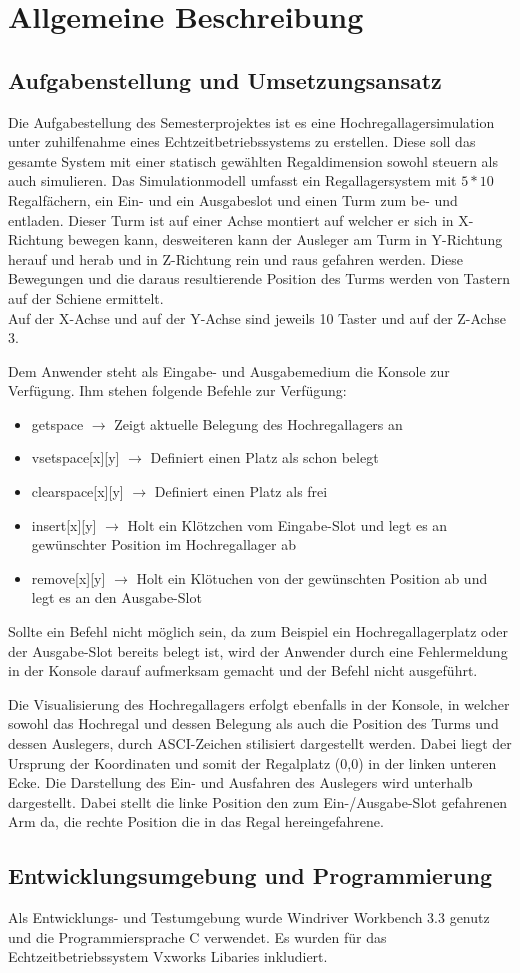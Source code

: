 \section{Allgemeine Beschreibung}
\subsection{Aufgabenstellung und Umsetzungsansatz}
Die Aufgabestellung des Semesterprojektes ist es eine Hochregallagersimulation unter zuhilfenahme eines Echtzeitbetriebssystems zu erstellen. Diese soll das gesamte System mit einer statisch gewählten Regaldimension sowohl steuern als auch simulieren.
Das Simulationmodell umfasst ein Regallagersystem mit $5*10$ Regalfächern, ein Ein- und ein Ausgabeslot und einen Turm zum be- und entladen. Dieser Turm ist auf einer Achse montiert auf welcher er sich in X-Richtung bewegen kann, desweiteren kann der Ausleger am Turm in Y-Richtung herauf und herab und in Z-Richtung rein und raus gefahren werden. Diese Bewegungen und die daraus resultierende Position des Turms werden von Tastern auf der Schiene ermittelt.\\
Auf der X-Achse und auf der Y-Achse sind jeweils 10 Taster und auf der Z-Achse 3.

Dem Anwender steht als Eingabe- und Ausgabemedium die Konsole zur Verfügung.
\newline\newline
Ihm stehen folgende Befehle zur Verfügung:
\begin{itemize} 
	\item getspace $\rightarrow$ Zeigt aktuelle Belegung des Hochregallagers an
	\item vsetspace[x][y] $\rightarrow$ Definiert einen Platz als schon belegt
	\item clearspace[x][y] $\rightarrow$ Definiert einen Platz als frei
	\item insert[x][y] $\rightarrow$ Holt ein Klötzchen vom Eingabe-Slot und legt es an gewünschter Position im Hochregallager ab
	\item remove[x][y] $\rightarrow$ Holt ein Klötuchen von der gewünschten Position ab und legt es an den Ausgabe-Slot
\end{itemize}

Sollte ein Befehl nicht möglich sein, da zum Beispiel ein Hochregallagerplatz oder der Ausgabe-Slot bereits belegt ist, wird der Anwender durch eine Fehlermeldung in der Konsole darauf aufmerksam gemacht und der Befehl nicht ausgeführt.

Die Visualisierung des Hochregallagers erfolgt ebenfalls in der Konsole, in welcher sowohl das Hochregal und dessen Belegung als auch die Position des Turms und dessen Auslegers, durch ASCI-Zeichen stilisiert dargestellt werden.
Dabei liegt der Ursprung der Koordinaten und somit der Regalplatz (0,0) in der linken unteren Ecke.
Die Darstellung des Ein- und Ausfahren des Auslegers wird unterhalb dargestellt. Dabei stellt die linke Position den zum Ein-/Ausgabe-Slot gefahrenen Arm da, die rechte Position die in das Regal hereingefahrene.

\subsection{Entwicklungsumgebung und Programmierung}
Als Entwicklungs- und Testumgebung wurde Windriver Workbench 3.3 genutz und die Programmiersprache C verwendet.
Es wurden für das Echtzeitbetriebssystem Vxworks Libaries inkludiert.


